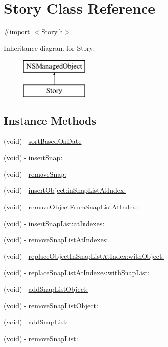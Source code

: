 \hypertarget{interface_story}{}\section{Story Class Reference}
\label{interface_story}


{\ttfamily \#import $<$Story.\+h$>$}

Inheritance diagram for Story\+:\begin{figure}[H]
\begin{center}
\leavevmode
\includegraphics[height=2.000000cm]{interface_story}
\end{center}
\end{figure}
\subsection*{Instance Methods}
\begin{DoxyCompactItemize}
\item 
(void) -\/ \hyperlink{interface_story_a7279a90208496b9f6040b62dfbdac620}{sort\+Based\+On\+Date}
\item 
(void) -\/ \hyperlink{interface_story_a26833828ef49f8ccd8731b7b2a276650}{insert\+Snap\+:}
\item 
(void) -\/ \hyperlink{interface_story_a8f71bc5c4f6847364d588bd2913755c4}{remove\+Snap\+:}
\item 
(void) -\/ \hyperlink{interface_story_ac7aaa8d738a55d8f7cb8fd0c26fd4b70}{insert\+Object\+:in\+Snap\+List\+At\+Index\+:}
\item 
(void) -\/ \hyperlink{interface_story_a2862a1453b5d1ec4410421feed5acfdd}{remove\+Object\+From\+Snap\+List\+At\+Index\+:}
\item 
(void) -\/ \hyperlink{interface_story_a84a4bc73fd231a323da10244fa876157}{insert\+Snap\+List\+:at\+Indexes\+:}
\item 
(void) -\/ \hyperlink{interface_story_a9c8c74f019b3ea3a94588064ea5fd7b6}{remove\+Snap\+List\+At\+Indexes\+:}
\item 
(void) -\/ \hyperlink{interface_story_a8e0f8bc62ff304aedad4d3cc99e9398d}{replace\+Object\+In\+Snap\+List\+At\+Index\+:with\+Object\+:}
\item 
(void) -\/ \hyperlink{interface_story_a4cbef9206e2e91b3fdadd1fd93a722d1}{replace\+Snap\+List\+At\+Indexes\+:with\+Snap\+List\+:}
\item 
(void) -\/ \hyperlink{interface_story_a34b377739386181624777fb994e5b02e}{add\+Snap\+List\+Object\+:}
\item 
(void) -\/ \hyperlink{interface_story_af05da85ccc12e572393216b85f297ce2}{remove\+Snap\+List\+Object\+:}
\item 
(void) -\/ \hyperlink{interface_story_a3464007fbbd05bb5bd748f811a83e103}{add\+Snap\+List\+:}
\item 
(void) -\/ \hyperlink{interface_story_a0d250a043b1896262bc08562ef7e889a}{remove\+Snap\+List\+:}
\end{DoxyCompactItemize}
